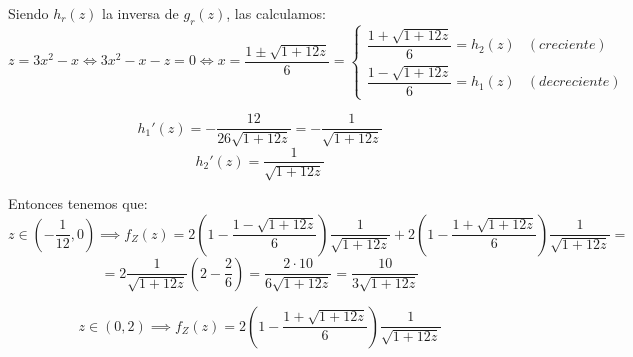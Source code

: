 \documentclass[openany]{book}
\begin{document}
\begin{exercise}
    Siendo $ h_{r}(z) $ la inversa de $ g_{r}(z) $, las calculamos:
    $$ z = 3x^2-x \iff 3x^2-x-z = 0 \iff x = \dfrac{1 \pm \sqrt{1+12z}}{6} = \left\{
    \begin{array}{lr}
        \dfrac{1+\sqrt{1+12z}}{6} = h_2(z) & (creciente)\\
        \dfrac{1-\sqrt{1+12z}}{6} = h_1(z) & (decreciente)
    \end{array}
    \right. $$

    $$ h_1'(z) = -\dfrac{12}{26 \sqrt{1+12z}} = -\dfrac{1}{\sqrt{1+12z}} $$
    $$ h_2'(z) = \dfrac{1}{\sqrt{1+12z}} $$

    Entonces tenemos que:
    $$z \in \left(-\dfrac{1}{12},0\right) \implies f_{Z}(z) = 2\left(1-\dfrac{1-\sqrt{1+12z}}{6}\right) \dfrac{1}{\sqrt{1+12z}} + 2\left(1-\dfrac{1+\sqrt{1+12z}}{6}\right) \dfrac{1}{\sqrt{1+12z}} =  $$
    $$ = 2 \dfrac{1}{\sqrt{1+12z}} \left( 2-\dfrac{2}{6} \right) = \dfrac{2 \cdot 10}{6\sqrt{1+12z}} = \dfrac{10}{3 \sqrt{1+12z}} $$

    $$ z \in (0,2) \implies f_{Z}(z) = 2\left(1-\dfrac{1+\sqrt{1+12z}}{6}\right) \dfrac{1}{\sqrt{1+12z}} $$


\end{exercise}
\end{document}
